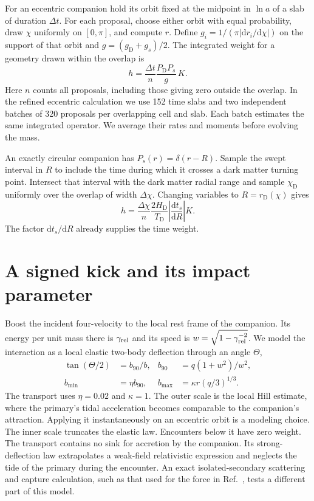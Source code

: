 \documentclass[aps,prd,reprint,amsmath,amssymb,nofootinbib]{revtex4-2}
\newcommand{\dd}{\mathrm{d}}
\newcommand{\DM}{\mathrm D}
\begin{document}
For an eccentric companion hold its orbit fixed at the midpoint in $\ln a$ of a slab of duration $\Delta t$. For each proposal, choose either orbit with equal probability, draw $\chi$ uniformly on $[0,\pi]$, and compute $r$. Define $g_i=1/(\pi|\dd r_i/\dd\chi|)$ on the support of that orbit and $g=(g_\DM+g_s)/2$. The integrated weight for a geometry drawn within the overlap is
\begin{equation}
 h=\frac{\Delta t}{n}\frac{P_\DM P_s}{g}\,K .
 \label{proposal}
\end{equation}
Here $n$ counts all proposals, including those giving zero outside the overlap. In the refined eccentric calculation we use 152 time slabs and two independent batches of 320 proposals per overlapping cell and slab. Each batch estimates the same integrated operator. We average their rates and moments before evolving the mass.

An exactly circular companion has $P_s(r)=\delta(r-R)$. Sample the swept interval in $R$ to include the time during which it crosses a dark matter turning point. Intersect that interval with the dark matter radial range and sample $\chi_\DM$ uniformly over the overlap of width $\Delta\chi$. Changing variables to $R=r_\DM(\chi)$ gives
\begin{equation}
 h=\frac{\Delta\chi}{n}\frac{2H_\DM}{T_\DM}
        \left|\frac{\dd t_s}{\dd R}\right| K .
 \label{circle}
\end{equation}
The factor $\dd t_s/\dd R$ already supplies the time weight.

\section{A signed kick and its impact parameter}
Boost the incident four-velocity to the local rest frame of the companion. Its energy per unit mass there is $\gamma_{\rm rel}$ and its speed is $w=\sqrt{1-\gamma_{\rm rel}^{-2}}$. We model the interaction as a local elastic two-body deflection through an angle $\Theta$,
\begin{align}
 \tan(\Theta/2)&=b_{90}/b, & b_{90}&=q(1+w^2)/w^2,\nonumber\\
 b_{\min}&=\eta b_{90}, & b_{\max}&=\kappa r(q/3)^{1/3}.
 \label{cuts}
\end{align}
The transport uses $\eta=0.02$ and $\kappa=1$. The outer scale is the local Hill estimate, where the primary's tidal acceleration becomes comparable to the companion's attraction. Applying it instantaneously on an eccentric orbit is a modeling choice. The inner scale truncates the elastic law. Encounters below it have zero weight. The transport contains no sink for accretion by the companion. Its strong-deflection law extrapolates a weak-field relativistic expression and neglects the tide of the primary during the encounter. An exact isolated-secondary scattering and capture calculation, such as that used for the force in Ref.~\cite{Vicente}, tests a different part of this model.
\end{document}
